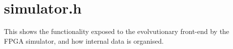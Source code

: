 \documentclass[ %
                    author={Alexander Dalton},
                supervisor={Prof. Seth Bullock},
                    degree={MEng},
                     title={Exploring Evolutionary Hardware:},
                  subtitle={Evolved Binary Arithmetic Circuits and Dynamic Problems},
                      type={research},
                      year={2018} ]{dissertation}
\begin{document}
\backmatter





\appendix

\chapter{simulator.h}
This shows the functionality exposed to the evolvutionary front-end by the
FPGA simulator, and how internal data is organised.
\end{document}
